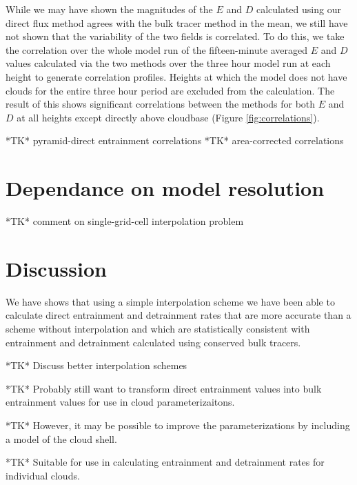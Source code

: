 \documentclass[12pt]{article}
\begin{document}
While we may have shown the magnitudes of the $E$ and $D$ calculated using our
direct flux method agrees with the bulk tracer method in the mean, we still 
have not shown that the variability of the two fields is correlated.  To do
this, we take the correlation over the whole model run of the fifteen-minute
averaged $E$ and $D$ values calculated via the two methods over the three hour
model run at each height to generate correlation profiles.  Heights at which 
the model does not have clouds for the entire three hour period are excluded 
from the calculation.  The result of this shows significant correlations 
between the methods for both $E$ and $D$ at all heights except directly above 
cloudbase (Figure \ref{fig:correlations}).

*TK* pyramid-direct entrainment correlations
*TK* area-corrected correlations


\section{Dependance on model resolution}

*TK* comment on single-grid-cell interpolation problem


\section{Discussion}

We have shows that using a simple interpolation scheme we have been able to 
calculate direct entrainment and detrainment rates that are more accurate than 
a scheme without interpolation and which are statistically consistent with 
entrainment and detrainment calculated using conserved bulk tracers.

*TK* Discuss better interpolation schemes

*TK* Probably still want to transform direct entrainment values into bulk 
entrainment values for use in cloud parameterizaitons.

*TK* However, it may be possible to improve the parameterizations by including 
a model of the cloud shell.

*TK* Suitable for use in calculating entrainment and detrainment rates for 
individual clouds.

\end{document}

